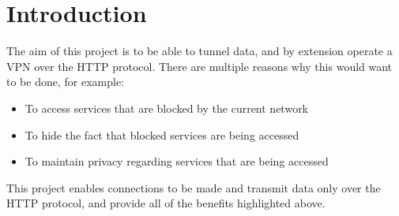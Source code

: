 \section{Introduction}
The aim of this project is to be able to tunnel data, and by extension operate a VPN over the HTTP protocol. There are multiple reasons why this would want to be done, for example:
\begin{itemize}
    \item To access services that are blocked by the current network
    \item To hide the fact that blocked services are being accessed
    \item To maintain privacy regarding services that are being accessed
\end{itemize}

This project enables connections to be made and transmit data only over the HTTP protocol, and provide all of the benefits highlighted above.


